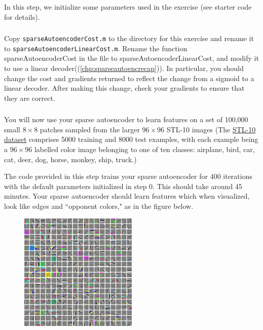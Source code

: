 \subsubsection{}


In this step, we initialize some parameters used in the exercise (see starter code for details).

\subsubsection{}


Copy \texttt{sparseAutoencoderCost.m} to the directory for this exercise and rename it to \texttt{sparseAutoencoderLinearCost.m}. Rename the function sparseAutoencoderCost in the file to sparseAutoencoderLinearCost, and modify it to use a linear decoder((\ref{chp:sparseautoencrecap})). In particular, you should change the cost and gradients returned to reflect the change from a sigmoid to a linear decoder. After making this change, check your gradients to ensure that they are correct.

\subsubsection{}


You will now use your sparse autoencoder to learn features on a set of 100,000 small $8 \times 8$ patches sampled from the larger $96 \times 96$ STL-10 images (The \href{http://www.stanford.edu/~acoates//stl10/}{STL-10 dataset} comprises 5000 training and 8000 test examples, with each example being a $96 \times 96$ labelled color image belonging to one of ten classes: airplane, bird, car, cat, deer, dog, horse, monkey, ship, truck.)

The code provided in this step trains your sparse autoencoder for 400 iterations with the default parameters initialized in step 0. This should take around 45 minutes. Your sparse autoencoder should learn features which when visualized, look like edges and ``opponent colors," as in the figure below.

\begin{figure}[ht] \centering
  \includegraphics[width=0.5\textwidth]{figures/CNN_Features_Good.png}
\end{figure}


